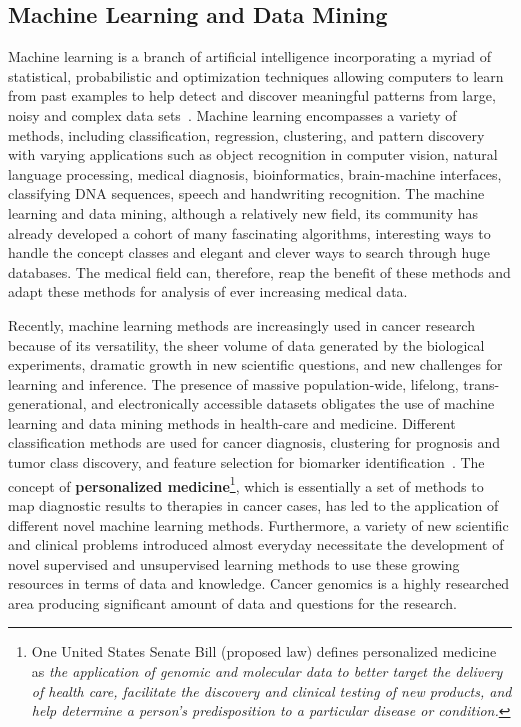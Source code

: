 \subsection*{Machine Learning and Data Mining}
\label{ss:mldm}
Machine learning is a branch of artificial intelligence incorporating a myriad of statistical, probabilistic and optimization techniques allowing computers to learn from past examples to help detect and discover meaningful patterns from large, noisy and complex data sets~\cite{mitchell, hykin, bishop}. Machine learning encompasses a variety of methods, including classification, regression, clustering, and pattern discovery with varying applications such as object recognition in computer vision, natural language processing, medical diagnosis, bioinformatics, brain-machine interfaces, classifying DNA sequences, speech and handwriting recognition. The machine learning and data mining, although a relatively new field, its community has already developed a cohort of many fascinating algorithms, interesting ways to handle the concept classes and elegant and clever ways to search through huge databases. The medical field can, therefore, reap the benefit of these methods and adapt these methods for analysis of ever increasing medical data.

Recently, machine learning methods are increasingly used in cancer research because of its versatility, the sheer volume of data generated by the biological experiments, dramatic growth in new scientific questions, and new challenges for learning and inference. The presence of massive population-wide, lifelong, trans-generational, and electronically accessible datasets obligates the use of machine learning and data mining methods in health-care and medicine. Different classification methods are used for cancer diagnosis, clustering for prognosis and tumor class discovery, and feature selection for biomarker identification~\cite{mlforcr}.  The concept of \textbf{personalized medicine}\footnote{One United States Senate Bill (proposed law) defines personalized medicine as \emph {the application of genomic and molecular data to better target the delivery of health care, facilitate the discovery and clinical testing of new products, and help determine a person's predisposition to a particular disease or condition.}}, which is essentially a set of methods to map diagnostic results to therapies in cancer cases, has led to the application of different novel machine learning methods. Furthermore, a variety of new scientific and clinical problems introduced almost everyday necessitate  the  development of novel supervised and unsupervised learning methods to use these growing resources in terms of data and knowledge. Cancer genomics is a highly researched area producing significant amount of data and questions for the research.

